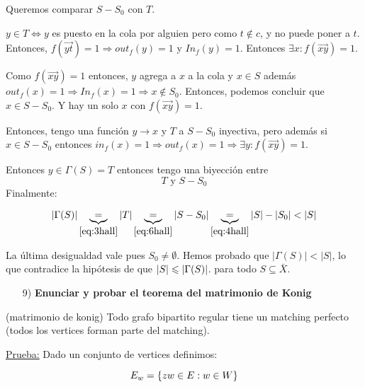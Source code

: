 \documentclass[12pt,a4paper]{article}
\begin{document}
Queremos comparar $S - S_{0}$ con $T$.
\medskip

$y\in T \Leftrightarrow y$ es puesto en la cola por alguien pero como $t\notin c$, 
y no puede poner a $t$. Entonces, $f(\overrightarrow{yt})=1 \Rightarrow out_{f}(y)=1$ 
y $In_{f}(y)=1$. Entonces $\exists x: f(\overrightarrow{xy})=1$.
\medskip

Como $f(\overrightarrow{xy})=1$ entonces, $y$ agrega a $x$ a la cola y $x\in S$ 
además $out_{f}(x) =1 \Rightarrow In_{f}(x)=1 \Rightarrow x \notin S_{0}$. 
Entonces, podemos concluir que $x\in S-S_{0}$. Y hay un solo $x$ con 
$f(\overrightarrow{xy})=1$.
\medskip

Entonces, tengo una función $y\to x$ y $T$ a $S-S_{0}$ inyectiva, pero además 
si $x\in S-S_{0}$ entonces $in_{f}(x)=1 \Rightarrow out_{f}(x)=1 \Rightarrow \exists y: f(\overrightarrow{xy})=1$.
\medskip

Entonces $y\in \Gamma(S) = T$ entonces tengo una biyección entre 
\begin{equation}
    T\,\, \text{y}\,\, S-S_{0}
    \label{eq:6hall}
\end{equation}
Finalmente:

\begin{equation}
    |\Gamma(S)| \underbrace{=}_{\ref{eq:3hall}} |T| \underbrace{=}_{\ref{eq:6hall}} |S-S_{0}| \underbrace{=}_{\ref{eq:4hall}} |S| - |S_{0}| < |S|
\end{equation}

La última desigualdad vale pues $S_{0} \neq \emptyset$. Hemos probado que 
$|\Gamma(S)| < |S|$, lo que contradice la hipótesis de que $|S| \leqslant |\Gamma(S)|$.
para todo $S \subseteq \bar{X}$.
\begin{itemize}
    \item [9)] \textbf{Enunciar y probar el teorema del matrimonio de Konig}
    \label{dem:konig}
\end{itemize}

\begin{teorema} (matrimonio de konig) Todo grafo bipartito regular tiene un matching 
    perfecto (todos los vertices forman parte del matching).
\end{teorema}

\underline{Prueba:} Dado un conjunto de vertices definimos:

$$E_{w} = \left\lbrace zw\in E: w\in W \right\rbrace$$
\end{document}
